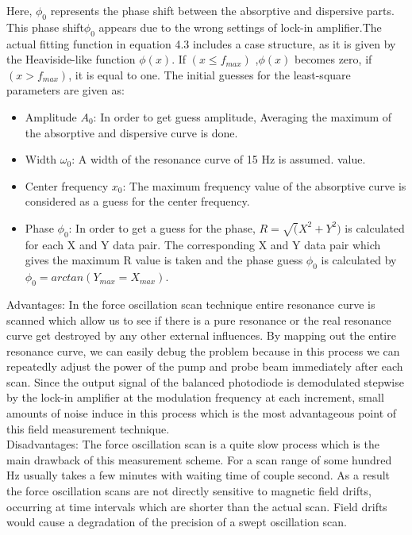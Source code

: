 Here, $\phi_{0} $ represents the phase shift between the absorptive and dispersive parts. This phase shift$\phi_{0}$ appears due to the wrong settings of lock-in amplifier.The actual fitting function in equation 4.3 includes a case
structure, as it is given by the Heaviside-like function $\phi(x)$. If $ (x \leq f_{max}) $ ,$\phi(x)$ becomes zero,
if $(x > f_{max})$, it is equal to one. The initial guesses for the least-square parameters are given
as:\\
\begin{itemize}
\item
Amplitude $A_0$: In order to get guess amplitude, Averaging the maximum of the absorptive and dispersive curve is done.
\item
Width $\omega_0$: A width of the resonance curve of 15 Hz is assumed.
value.
\item
Center frequency $x_0$: The maximum frequency value of the
absorptive curve is considered as a guess for the center frequency.
\item
Phase $\phi_0$: In order to get a guess for the phase, $ R =\sqrt (
X^2 + Y ^2)$ is calculated for each
X and Y data pair. The corresponding X and Y data pair which gives the maximum
R value is taken and the phase guess $\phi _0$  is calculated by $\phi _0 = arctan(Y_{max}=X_{max})$.
\end{itemize}
Advantages: In the force oscillation scan technique entire resonance curve is scanned which allow us to see if there is a pure resonance or the real resonance curve get destroyed by any other external influences. By mapping out the entire resonance curve, we can easily debug the problem because in this process we can repeatedly adjust the power of the pump and probe beam immediately after each scan. Since the output signal of the balanced photodiode is demodulated stepwise by the lock-in amplifier at the modulation frequency at each increment, small amounts of noise induce in this process which is the most advantageous point of this field measurement technique. \\
Disadvantages: The force oscillation scan is a quite slow process which is the main drawback of this measurement scheme.
For a scan range of some hundred Hz usually takes a few minutes with  waiting time of couple second. As a result the force oscillation scans are not directly sensitive to magnetic field drifts, occurring at time intervals which are shorter than the actual scan. Field drifts would cause a degradation of the precision of a swept oscillation scan.
